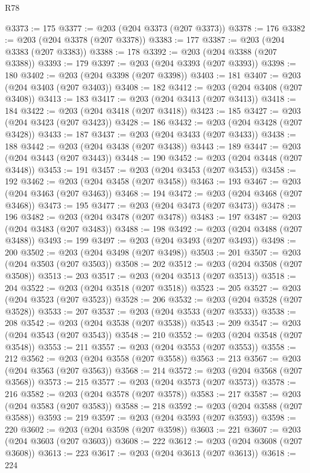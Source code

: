 \begin{lexlean}{R78}
\begin{coremodule}
@3373 := 175
@3377 := @203 (@204 @3373 (@207 @3373))
@3378 := 176
@3382 := @203 (@204 @3378 (@207 @3378))
@3383 := 177
@3387 := @203 (@204 @3383 (@207 @3383))
@3388 := 178
@3392 := @203 (@204 @3388 (@207 @3388))
@3393 := 179
@3397 := @203 (@204 @3393 (@207 @3393))
@3398 := 180
@3402 := @203 (@204 @3398 (@207 @3398))
@3403 := 181
@3407 := @203 (@204 @3403 (@207 @3403))
@3408 := 182
@3412 := @203 (@204 @3408 (@207 @3408))
@3413 := 183
@3417 := @203 (@204 @3413 (@207 @3413))
@3418 := 184
@3422 := @203 (@204 @3418 (@207 @3418))
@3423 := 185
@3427 := @203 (@204 @3423 (@207 @3423))
@3428 := 186
@3432 := @203 (@204 @3428 (@207 @3428))
@3433 := 187
@3437 := @203 (@204 @3433 (@207 @3433))
@3438 := 188
@3442 := @203 (@204 @3438 (@207 @3438))
@3443 := 189
@3447 := @203 (@204 @3443 (@207 @3443))
@3448 := 190
@3452 := @203 (@204 @3448 (@207 @3448))
@3453 := 191
@3457 := @203 (@204 @3453 (@207 @3453))
@3458 := 192
@3462 := @203 (@204 @3458 (@207 @3458))
@3463 := 193
@3467 := @203 (@204 @3463 (@207 @3463))
@3468 := 194
@3472 := @203 (@204 @3468 (@207 @3468))
@3473 := 195
@3477 := @203 (@204 @3473 (@207 @3473))
@3478 := 196
@3482 := @203 (@204 @3478 (@207 @3478))
@3483 := 197
@3487 := @203 (@204 @3483 (@207 @3483))
@3488 := 198
@3492 := @203 (@204 @3488 (@207 @3488))
@3493 := 199
@3497 := @203 (@204 @3493 (@207 @3493))
@3498 := 200
@3502 := @203 (@204 @3498 (@207 @3498))
@3503 := 201
@3507 := @203 (@204 @3503 (@207 @3503))
@3508 := 202
@3512 := @203 (@204 @3508 (@207 @3508))
@3513 := 203
@3517 := @203 (@204 @3513 (@207 @3513))
@3518 := 204
@3522 := @203 (@204 @3518 (@207 @3518))
@3523 := 205
@3527 := @203 (@204 @3523 (@207 @3523))
@3528 := 206
@3532 := @203 (@204 @3528 (@207 @3528))
@3533 := 207
@3537 := @203 (@204 @3533 (@207 @3533))
@3538 := 208
@3542 := @203 (@204 @3538 (@207 @3538))
@3543 := 209
@3547 := @203 (@204 @3543 (@207 @3543))
@3548 := 210
@3552 := @203 (@204 @3548 (@207 @3548))
@3553 := 211
@3557 := @203 (@204 @3553 (@207 @3553))
@3558 := 212
@3562 := @203 (@204 @3558 (@207 @3558))
@3563 := 213
@3567 := @203 (@204 @3563 (@207 @3563))
@3568 := 214
@3572 := @203 (@204 @3568 (@207 @3568))
@3573 := 215
@3577 := @203 (@204 @3573 (@207 @3573))
@3578 := 216
@3582 := @203 (@204 @3578 (@207 @3578))
@3583 := 217
@3587 := @203 (@204 @3583 (@207 @3583))
@3588 := 218
@3592 := @203 (@204 @3588 (@207 @3588))
@3593 := 219
@3597 := @203 (@204 @3593 (@207 @3593))
@3598 := 220
@3602 := @203 (@204 @3598 (@207 @3598))
@3603 := 221
@3607 := @203 (@204 @3603 (@207 @3603))
@3608 := 222
@3612 := @203 (@204 @3608 (@207 @3608))
@3613 := 223
@3617 := @203 (@204 @3613 (@207 @3613))
@3618 := 224

\end{coremodule}
\end{lexlean}
